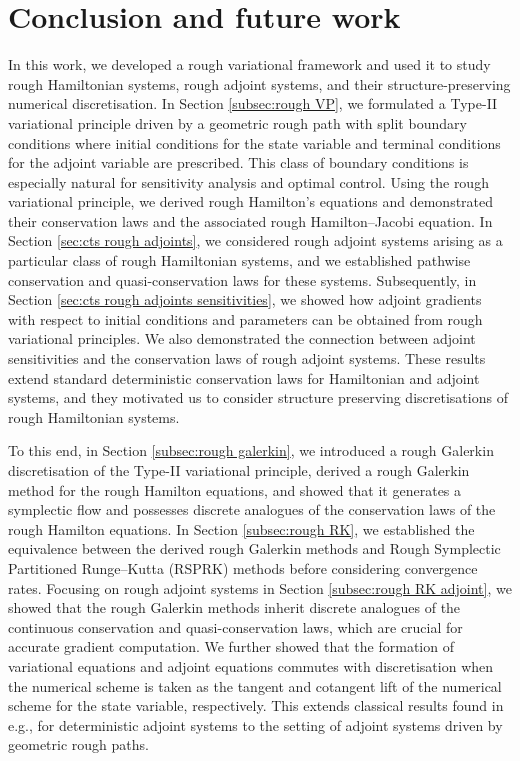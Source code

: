 \documentclass[11pt, oneside]{article}
\numberwithin{equation}{section}
\theoremstyle{definition}
\begin{document}
\section{Conclusion and future work}\label{sec:conclusion}
In this work, we developed a rough variational framework and used it to study rough Hamiltonian systems, rough adjoint systems, and their structure-preserving numerical discretisation. In Section \ref{subsec:rough VP}, we formulated a Type-II variational principle driven by a geometric rough path with split boundary conditions where initial conditions for the state variable and terminal conditions for the adjoint variable are prescribed. This class of boundary conditions is especially natural for sensitivity analysis and optimal control. Using the rough variational principle, we derived rough Hamilton's equations and demonstrated their conservation laws and the associated rough Hamilton--Jacobi equation. In Section \ref{sec:cts rough adjoints}, we considered rough adjoint systems arising as a particular class of rough Hamiltonian systems, and we established pathwise conservation and quasi-conservation laws for these systems. Subsequently, in Section \ref{sec:cts rough adjoints sensitivities}, we showed how adjoint gradients with respect to initial conditions and parameters can be obtained from rough variational principles. We also demonstrated the connection between adjoint sensitivities and the conservation laws of rough adjoint systems. These results extend standard deterministic conservation laws for Hamiltonian and adjoint systems, and they motivated us to consider structure preserving discretisations of rough Hamiltonian systems.

To this end, in Section \ref{subsec:rough galerkin}, we introduced a rough Galerkin discretisation of the Type-II variational principle, derived a rough Galerkin method for the rough Hamilton equations, and showed that it generates a symplectic flow and possesses discrete analogues of the conservation laws of the rough Hamilton equations. In Section \ref{subsec:rough RK}, we established the equivalence between the derived rough Galerkin methods and Rough Symplectic Partitioned Runge--Kutta (RSPRK) methods before considering convergence rates. Focusing on rough adjoint systems in Section \ref{subsec:rough RK adjoint}, we showed that the rough Galerkin methods inherit discrete analogues of the continuous conservation and quasi-conservation laws, which are crucial for accurate gradient computation. We further showed that the formation of variational equations and adjoint equations commutes with discretisation when the numerical scheme is taken as the tangent and cotangent lift of the numerical scheme for the state variable, respectively. This extends classical results found in e.g., \cite{Sanz-Serna2016} for deterministic adjoint systems to the setting of adjoint systems driven by geometric rough paths.
\end{document}
